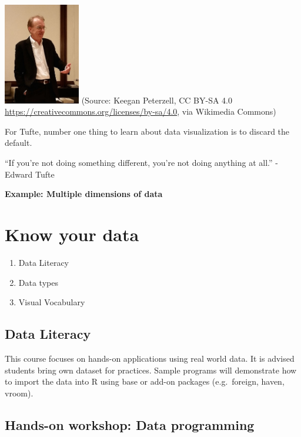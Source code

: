 \documentclass[
]{book}
\providecommand{\tightlist}{%
  \setlength{\itemsep}{0pt}\setlength{\parskip}{0pt}}
\begin{document}
\includegraphics[width=0.25\textwidth,height=\textheight]{images/EdwardTufte.jpg}
(Source: Keegan Peterzell, CC BY-SA 4.0 \url{https://creativecommons.org/licenses/by-sa/4.0}, via Wikimedia Commons)

For Tufte, number one thing to learn about data visualization is to discard the default.

``If you're not doing something different, you're not doing anything at all.''
- Edward Tufte

\textbf{Example: Multiple dimensions of data}

\hypertarget{know-your-data}{%
\section{Know your data}\label{know-your-data}}

\begin{enumerate}
\def\labelenumi{\arabic{enumi}.}
\tightlist
\item
  Data Literacy
\item
  Data types
\item
  Visual Vocabulary
\end{enumerate}

\hypertarget{data-literacy}{%
\subsection{Data Literacy}\label{data-literacy}}

This course focuses on hands-on applications using real world data. It is advised students bring own dataset for practices. Sample programs will demonstrate how to import the data into R using base or add-on packages (e.g.~foreign, haven, vroom).

\hypertarget{hands-on-workshop-data-programming}{%
\subsection{Hands-on workshop: Data programming}\label{hands-on-workshop-data-programming}}
\end{document}
